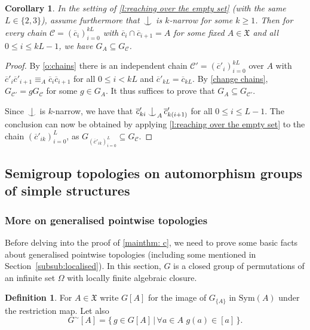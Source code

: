 \documentclass{article}
\newtheorem{corollary}[theorem]{Corollary}
\theoremstyle{remark}
\theoremstyle{definition}
\newtheorem{definition}[theorem]{Definition}
\newcommand{\X}[0]{\mathfrak{X}}
\def\Ind#1#2{#1\setbox0=\hbox{$#1x$}\kern\wd0\hbox to 0pt{\hss$#1\mid$\hss}
	\lower.9\ht0\hbox to 0pt{\hss$#1\smile$\hss}\kern\wd0}
\def\ind{\mathop{\mathpalette\Ind{}}}
\newcommand{\orq}[0]{\equiv}
\renewcommand\leq{\leqslant}
\renewcommand\geq{\geqslant}
\newcommand{\gc}[0]{G^{\sim}}
\begin{document}
{{{{{  \begin{corollary}
  	\label{c:reachability} In the setting of \cref{l:reaching over the empty set} (with the same $L\in\{2,3\}$), assume furthermore that $\ind$ is $k$-narrow for some $k\geq 1$. Then for every chain $\mathcal{C}=(\overline{c}_{i})_{i=0}^{kL}$ with $\overline{c}_{i}\cap \overline{c}_{i+1}=A$ for some fixed $A\in\X$ and all $0\leq i\leq kL-1$, we have $G_{A}\subseteq G_{\mathcal{C}}$. 
  \end{corollary}
  \begin{proof}
  	By \cref{o:chains}  there is an independent chain $\mathcal{C}'=(\overline{c}'_{i})_{i=0}^{kL}$ over $A$ with $\overline{c}'_{i}\overline{c}'_{i+1}\orq_{A}\overline{c}_{i}\overline{c}_{i+1}$ for all $0\leq i<kL$ and $\overline{c}'_{kL}=\overline{c}_{kL}$. 
    By \cref{change chains}, $G_{\mathcal{C}'}=gG_{\mathcal{C}}$ for some $g\in G_{A}$. It thus suffices to prove that $G_{A}\subseteq G_{\mathcal{C}'}$. 
  	 
  	Since $\ind$ is $k$-narrow, we have that $\overline{c}'_{ki}\ind_{A} \overline{c}'_{k(i+1)}$ for all $0\leq i\leq L-1$. The conclusion can now be obtained by applying \cref{l:reaching over the empty set} to the chain $(\overline{c}'_{ik})_{i=0}^{L}$, as $G_{(\overline{c}'_{ik})_{i=0}^{L}}\subseteq G_{\mathcal{C}}$. 
  \end{proof}
  

  


  
 
    \subsection{Semigroup topologies on automorphism groups of simple structures}

\subsubsection{More on generalised pointwise topologies}
Before delving into the proof of \cref{mainthm: c}, we need to prove some basic facts about generalised pointwise topologies (including some mentioned in Section~\ref{subsub:localised}). In this section, $G$ is a closed group of permutations of an infinite set $\Omega$ with locally finite algebraic closure. 

\begin{definition}
    {For $A\in\X$ write $G[A]$ for the image of $G_{\{A\}}$ in $\mathrm{Sym}(A)$ under the restriction map. Let also} 
	\begin{equation*}
		\gc[A]=\{\,g\in G[A]\,|\,\forall a\in A\,\,g(a)\in[a]\,\}.
	\end{equation*}
\end{definition}


}}}}}
\end{document}
